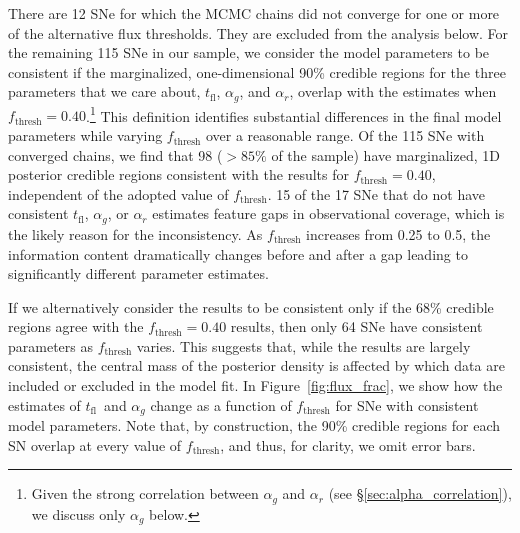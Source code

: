 \documentclass[twocolumn]{./aastex63}
\newcommand{\tfl}{$t_\mathrm{fl}$}
\begin{document}
There are 12 SNe for which the MCMC chains did not converge for one or more of
the alternative flux thresholds. They are excluded from the analysis below.
For the remaining 115 SNe in our sample, we consider the model parameters to
be consistent if the marginalized, one-dimensional 90\% credible regions for
the three parameters that we care about, \tfl, $\alpha_g$, and $\alpha_r$,
overlap with the estimates when $f_\mathrm{thresh} = 0.40$.\footnote{Given the
strong correlation between $\alpha_g$ and $\alpha_r$ (see
\S\ref{sec:alpha_correlation}), we discuss only $\alpha_g$ below.} This
definition identifies substantial differences in the final model parameters
while varying $f_\mathrm{thresh}$ over a reasonable range. Of the 115 SNe with
converged chains, we find that 98 ($> 85\%$ of the sample) have marginalized,
1D posterior credible regions consistent with the results for
$f_\mathrm{thresh} = 0.40$, independent of the adopted value of
$f_\mathrm{thresh}$. 15 of the 17 SNe that do not have consistent \tfl,
$\alpha_g$, or $\alpha_r$ estimates feature gaps in observational coverage,
which is the likely reason for the inconsistency. As $f_\mathrm{thresh}$
increases from 0.25 to 0.5, the information content dramatically changes
before and after a gap leading to significantly different parameter estimates.

If we alternatively consider the results to be consistent only if the 68\%
credible regions agree with the $f_\mathrm{thresh} = 0.40$ results, then only
64 SNe have consistent parameters as $f_\mathrm{thresh}$ varies. This suggests
that, while the results are largely consistent, the central mass of the
posterior density is affected by which data are included or excluded in the
model fit. In Figure~\ref{fig:flux_frac}, we show how the estimates of \tfl\
and $\alpha_g$ change as a function of $f_\mathrm{thresh}$ for SNe with
consistent model parameters. Note that, by construction, the 90\% credible
regions for each SN overlap at every value of $f_\mathrm{thresh}$, and thus,
for clarity, we omit error bars.
\end{document}

